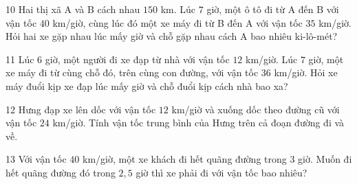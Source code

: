 \gap
\begin{probbox}{10}{\relax}
Hai thị xã A và B cách nhau $150$ km. Lúc $7$ giờ, một ô tô đi từ A đến B với vận tốc $40$ km/giờ, cùng lúc đó một xe máy đi từ B đến A với vận tốc $35$ km/giờ. Hỏi hai xe gặp nhau lúc mấy giờ và chỗ gặp nhau cách A bao nhiêu ki-lô-mét?
\end{probbox}
\gap
\begin{probbox}{11}{\relax}
Lúc $6$ giờ, một người đi xe đạp từ nhà với vận tốc $12$ km/giờ. Lúc $7$ giờ, một xe máy đi từ cùng chỗ đó, trên cùng con đường, với vận tốc $36$ km/giờ. Hỏi xe máy đuổi kịp xe đạp lúc mấy giờ và chỗ đuổi kịp cách nhà bao xa?
\end{probbox}
\gap
\begin{probbox}{12}{}
Hưng đạp xe lên dốc với vận tốc $12$ km/giờ và xuống dốc theo đường cũ với vận tốc $24$ km/giờ. Tính vận tốc trung bình của Hưng trên cả đoạn đường đi và về.
\end{probbox}
\gap
\begin{probbox}{13}{\relax}
Với vận tốc $40$ km/giờ, một xe khách đi hết quãng đường trong $3$ giờ. Muốn đi hết quãng đường đó trong $2{,}5$ giờ thì xe phải đi với vận tốc bao nhiêu?
\end{probbox}

